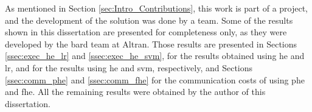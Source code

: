 As mentioned in Section \ref{sec:Intro_Contributions}, this work is part of a project, and the development of the solution was done by a team. Some of the results shown in this dissertation are presented for completeness only, as they were developed by the \ac{bard} team at Altran. Those results are presented in Sections \ref{ssec:exec_he_lr} and \ref{ssec:exec_he_svm}, for the results obtained using \ac{he} and \ac{lr}, and for the results using \ac{he} and \ac{svm}, respectively, and Sections \ref{ssec:comm_phe} and \ref{ssec:comm_fhe} for the communication costs of using \ac{phe} and \ac{fhe}. All the remaining results were obtained by the author of this dissertation.
